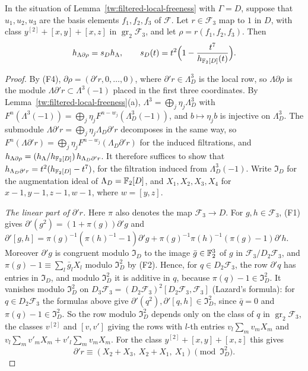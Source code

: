 \begin{lemma}\label{tw:local-fox}
In the situation of Lemma~\ref{tw:filtered-local-freeness} with $\Gamma=D$,
suppose that $u_1,u_2,u_3$ are the basis elements $f_1,f_2,f_3$ of
$\mathcal F$. Let $r\in\mathcal F_3$ map to $1$ in $D$, with class
$y^{[2]}+[x,y]+[x,z]$ in $\operatorname{gr}_2\mathcal F_3$, and let
$\rho=r(f_1,f_2,f_3)$. Then
\[
 h_{\Lambda\partial\rho}=s_Dh_\Lambda,\qquad
 s_D(t)=t^2\Bigl(1-\frac{t^7}{h_{\mathbb F_2[D]}(t)}\Bigr).
\]
\end{lemma}

\begin{proof}
By (F4), $\partial\rho=(\partial'r,0,\dots,0)$, where
$\partial'r\in\Lambda_D^3$ is the local row, so $\Lambda\partial\rho$ is the
module $\Lambda\partial'r\subset\Lambda^3(-1)$ placed in the first three
coordinates. By Lemma~\ref{tw:filtered-local-freeness}(a),
$\Lambda^3=\bigoplus_j\eta_j\Lambda_D^3$ with
$F^n(\Lambda^3(-1))=\bigoplus_j\eta_jF^{n-w_j}(\Lambda_D^3(-1))$, and
$b\mapsto\eta_jb$ is injective on $\Lambda_D^3$. The submodule
$\Lambda\partial'r=\bigoplus_j\eta_j\Lambda_D\partial'r$ decomposes in the
same way, so
$F^n(\Lambda\partial'r)=\bigoplus_j\eta_jF^{n-w_j}(\Lambda_D\partial'r)$ for
the induced filtrations, and
$h_{\Lambda\partial\rho}=(h_\Lambda/h_{\mathbb F_2[D]})\,h_{\Lambda_D\partial'r}$. It
therefore suffices to show that $h_{\Lambda_D\partial'r}=t^2(h_{\mathbb F_2[D]}-t^7)$, for
the filtration induced from $\Lambda_D^3(-1)$. Write $\mathfrak I_D$ for the augmentation ideal of
$\Lambda_D=\mathbb F_2[D]$, and $X_1,X_2,X_3,X_4$ for $x-1,y-1,z-1,w-1$, where
$w=[y,z]$.

\emph{The linear part of $\partial'r$.} Here $\pi$ also denotes the map
$\mathcal F_3\to D$. For $g,h\in\mathcal F_3$, (F1) gives
$\partial'(g^2)=(1+\pi(g))\partial'g$ and
$\partial'[g,h]=\pi(g)^{-1}(\pi(h)^{-1}-1)\partial'g+\pi(g)^{-1}\pi(h)^{-1}(\pi(g)-1)\partial'h$.
Moreover $\partial'g$ is congruent modulo $\mathfrak I_D$ to the image
$\bar g\in\mathbb F_2^3$ of $g$ in $\mathcal F_3/D_2\mathcal F_3$, and
$\pi(g)-1\equiv\sum_l\bar g_lX_l$ modulo $\mathfrak I_D^2$ by (F2). Hence, for
$q\in D_2\mathcal F_3$, the row $\partial'q$ has entries in $\mathfrak I_D$,
and modulo $\mathfrak I_D^2$ it is additive in $q$, because
$\pi(q)-1\in\mathfrak I_D^2$. It vanishes modulo $\mathfrak I_D^2$ on
$D_3\mathcal F_3=(D_2\mathcal F_3)^2[D_2\mathcal F_3,\mathcal F_3]$ (Lazard's
formula): for $q\in D_2\mathcal F_3$ the formulas above give
$\partial'(q^2),\partial'[q,h]\in\mathfrak I_D^2$, since $\bar q=0$ and
$\pi(q)-1\in\mathfrak I_D^2$. So the row modulo $\mathfrak I_D^2$ depends
only on the class of $q$ in $\operatorname{gr}_2\mathcal F_3$, the classes
$v^{[2]}$ and $[v,v']$ giving the rows with $l$-th entries $v_l\sum_mv_mX_m$
and $v_l\sum_mv'_mX_m+v'_l\sum_mv_mX_m$.
For the class $y^{[2]}+[x,y]+[x,z]$ this gives
\[
 \partial'r\equiv(X_2+X_3,\ X_2+X_1,\ X_1)\pmod{\mathfrak I_D^2}.
\]


\end{proof}
